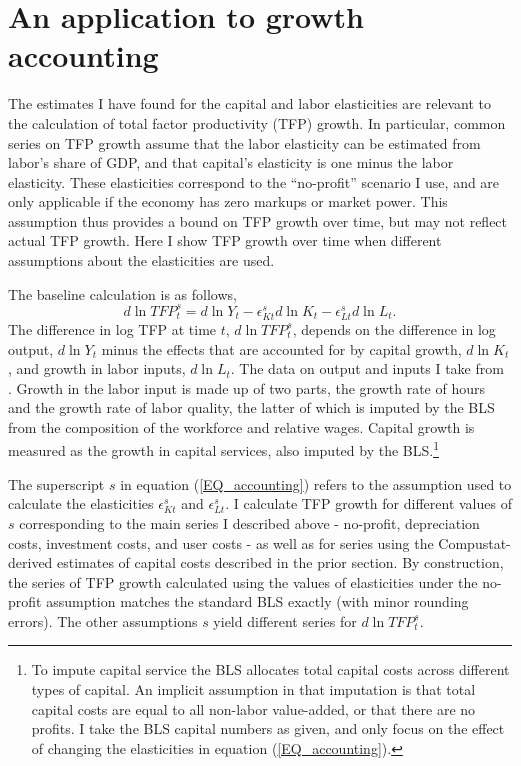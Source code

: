 \documentclass[11pt]{article}
\begin{document}
\section{An application to growth accounting}\label{SEC_accounting}
The estimates I have found for the capital and labor elasticities are relevant to the calculation of total factor productivity (TFP) growth. In particular, common series on TFP growth assume that the labor elasticity can be estimated from labor's share of GDP, and that capital's elasticity is one minus the labor elasticity. These elasticities correspond to the ``no-profit'' scenario I use, and are only applicable if the economy has zero markups or market power. This assumption thus provides a bound on TFP growth over time, but may not reflect actual TFP growth. Here I show TFP growth over time when different assumptions about the elasticities are used. 

The baseline calculation is as follows,
\begin{equation}
	d \ln TFP^s_t = d \ln Y_t - \epsilon^s_{Kt} d \ln K_t - \epsilon^s_{Lt} d \ln L_t. \label{EQ_accounting}
\end{equation}
The difference in log TFP at time $t$, $d \ln TFP^s_t$, depends on the difference in log output, $d \ln Y_t$ minus the effects that are accounted for by capital growth, $d \ln K_t$, and growth in labor inputs, $d \ln L_t$. The data on output and inputs I take from \cite{fernalddata}. Growth in the labor input is made up of two parts, the growth rate of hours and the growth rate of labor quality, the latter of which is imputed by the BLS from the composition of the workforce and relative wages. Capital growth is measured as the growth in capital services, also imputed by the BLS.\footnote{To impute capital service the BLS allocates total capital costs across different types of capital. An implicit assumption in that imputation is that total capital costs are equal to all non-labor value-added, or that there are no profits. I take the BLS capital numbers as given, and only focus on the effect of changing the elasticities in equation (\ref{EQ_accounting}).}

The superscript $s$ in equation (\ref{EQ_accounting}) refers to the assumption used to calculate the elasticities $\epsilon^s_{Kt}$ and $\epsilon^s_{Lt}$. I calculate TFP growth for different values of $s$ corresponding to the main series I described above - no-profit, depreciation costs, investment costs, and user costs - as well as for series using the Compustat-derived estimates of capital costs described in the prior section. By construction, the series of TFP growth calculated using the values of elasticities under the no-profit assumption matches the standard BLS exactly (with minor rounding errors). The other assumptions $s$ yield different series for $d \ln TFP^s_t$.
\end{document}
